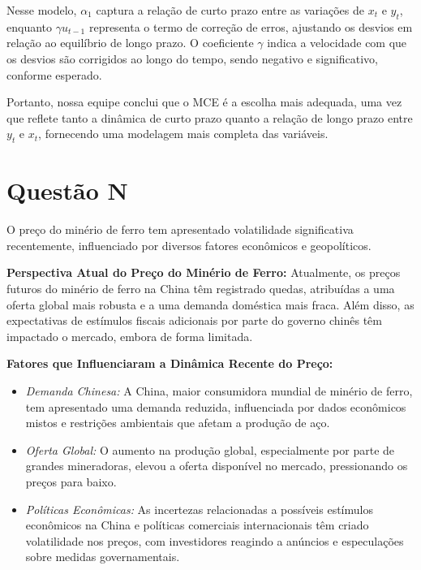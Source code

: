 \documentclass[a4paper,12pt]{article}[abntex2]
\begin{document}
Nesse modelo, $\alpha_1$ captura a relação de curto prazo entre as variações de $x_t$ e $y_t$, enquanto $\gamma u_{t-1}$ representa o termo de correção de erros, ajustando os desvios em relação ao equilíbrio de longo prazo. O coeficiente $\gamma$ indica a velocidade com que os desvios são corrigidos ao longo do tempo, sendo negativo e significativo, conforme esperado.

Portanto, nossa equipe conclui que o MCE é a escolha mais adequada, uma vez que reflete tanto a dinâmica de curto prazo quanto a relação de longo prazo entre $y_t$ e $x_t$, fornecendo uma modelagem mais completa das variáveis.


\section*{\textbf{Questão N}}

O preço do minério de ferro tem apresentado volatilidade significativa recentemente, influenciado por diversos fatores econômicos e geopolíticos.

\textbf{Perspectiva Atual do Preço do Minério de Ferro:} Atualmente, os preços futuros do minério de ferro na China têm registrado quedas, atribuídas a uma oferta global mais robusta e a uma demanda doméstica mais fraca. Além disso, as expectativas de estímulos fiscais adicionais por parte do governo chinês têm impactado o mercado, embora de forma limitada.

\textbf{Fatores que Influenciaram a Dinâmica Recente do Preço:}
\begin{itemize}
    \item \textit{Demanda Chinesa:} A China, maior consumidora mundial de minério de ferro, tem apresentado uma demanda reduzida, influenciada por dados econômicos mistos e restrições ambientais que afetam a produção de aço.
    
    \item \textit{Oferta Global:} O aumento na produção global, especialmente por parte de grandes mineradoras, elevou a oferta disponível no mercado, pressionando os preços para baixo.
    
    \item \textit{Políticas Econômicas:} As incertezas relacionadas a possíveis estímulos econômicos na China e políticas comerciais internacionais têm criado volatilidade nos preços, com investidores reagindo a anúncios e especulações sobre medidas governamentais.
\end{itemize}
\end{document}
